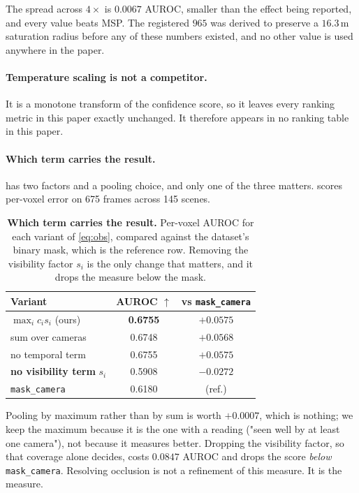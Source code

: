 \documentclass[10pt,twocolumn,letterpaper]{article}
\begin{document}
The spread across $4\times$ is $0.0067$ AUROC, smaller than the effect being
reported, and every value beats MSP. The registered $965$ was derived to
preserve a $16.3$\,m saturation radius before any of these numbers existed,
and no other value is used anywhere in the paper.

\paragraph{Temperature scaling is not a competitor.} It is a monotone
transform of the confidence score, so it leaves every ranking metric in this
paper exactly unchanged. It therefore appears in no ranking table in this paper.

\paragraph{Which term carries the result.}  has two factors and
a pooling choice, and only one of the three matters. 
scores per-voxel error on 675 frames across 145 scenes.

\begin{table}[t]
\centering\small
\begin{tabular}{lcc}
\toprule
Variant & AUROC $\uparrow$ & vs \texttt{mask\_camera} \\
\midrule
$\max_i c_i s_i$ \;(ours)        & \textbf{0.6755} & $+0.0575$ \\
sum over cameras                 & 0.6748 & $+0.0568$ \\
no temporal term                 & 0.6755 & $+0.0575$ \\
\textbf{no visibility term} $s_i$ & 0.5908 & $\mathbf{-0.0272}$ \\
\texttt{mask\_camera}            & 0.6180 & (ref.) \\
\bottomrule
\end{tabular}
\caption{\textbf{Which term carries the result.} Per-voxel AUROC for each
variant of \cref{eq:obs}, compared against the dataset's binary mask, which
is the reference row. Removing the visibility factor $s_i$ is the only
change that matters, and it drops the measure below the mask.}
\label{tab:variants}
\end{table}
Pooling by maximum rather than by sum is worth $+0.0007$, which is nothing;
we keep the maximum because it is the one with a reading ("seen well by at
least one camera"), not because it measures better. Dropping the visibility
factor, so that coverage alone decides, costs $0.0847$ AUROC and drops the
score \emph{below} \texttt{mask\_camera}. Resolving occlusion is not a
refinement of this measure. It is the measure.
\end{document}
